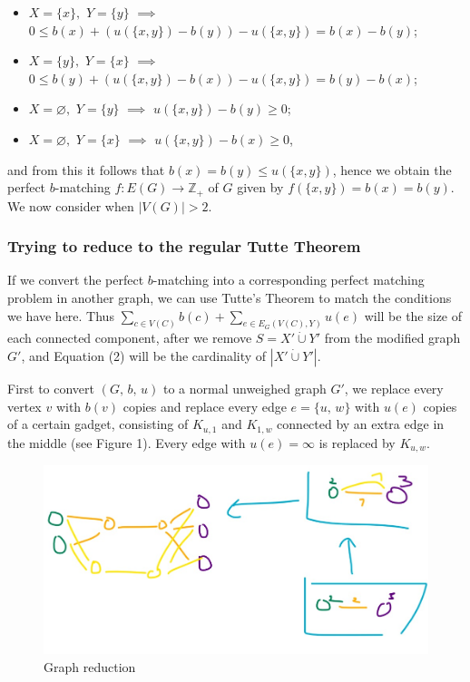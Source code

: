 \documentclass{article}
\let\emptyset\varnothing
\begin{document}
  \begin{itemize}
      \item $X=\{x\},$ $Y=\{y\}$ $\implies$ $0\leq b(x)+(u(\{x,y\})-b(y))-u(\{x,y\})=b(x)-b(y)$;
      \item $X=\{y\},$ $Y=\{x\}$ $\implies$ $0\leq b(y)+(u(\{x,y\})-b(x))-u(\{x,y\})=b(y)-b(x)$;
      \item $X=\emptyset,$ $Y=\{y\}$ $\implies$ $u(\{x,y\})-b(y)\geq 0$;
      \item $X=\emptyset,$ $Y=\{x\}$ $\implies$ $u(\{x,y\})-b(x)\geq 0$,
  \end{itemize}
  and from this it follows that $b(x)=b(y)\leq u(\{x,y\})$, hence we obtain the perfect $b$-matching $f:E(G)\rightarrow \mathbb{Z}_+$ of $G$ given by $f(\{x,y\})=b(x)=b(y)$. We now consider when $|V(G)|>2.$




  \subsubsection{Trying to reduce to the regular Tutte Theorem}
  If we convert the perfect $b$-matching into a corresponding perfect matching problem in another graph,
  we can use Tutte's Theorem to match the conditions we have here.
  Thus $\sum_{c\in V(C)}b(c) + \sum_{e\in E_G(V(C),Y)}u(e)$ will be the size of each connected component,
  after we remove $S = X' \dot\cup Y'$ from the modified graph $G'$,
  and Equation (2) will be the cardinality of $|X' \dot\cup Y'|$.

  First to convert $(G,\, b,\, u)$ to a normal unweighed graph $G'$,
  we replace every vertex $v$ with $b(v)$ copies and replace every edge $e = \{u,\, w\}$ with $u(e)$ copies
  of a certain gadget, consisting of $K_{u,1}$ and $K_{1,w}$ connected by an extra edge in the middle (see Figure 1).
  Every edge with $u(e) = \infty$ is replaced by $K_{u,w}$.

  \begin{figure}[h]
    \centering
    \includegraphics[width=.5\textwidth]{73graphs}
    \caption{Graph reduction}
    \label{fig:73graphs}
  \end{figure}
\end{document}
